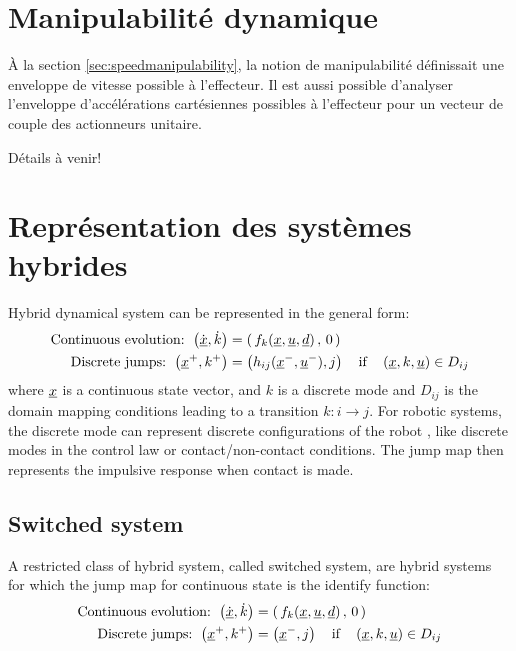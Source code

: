 \newpage
\section{Manipulabilité dynamique}
\label{sec:dynamicmanipulability}

À la section \ref{sec:speedmanipulability}, la notion de manipulabilité définissait une enveloppe de vitesse possible à l'effecteur. Il est aussi possible d'analyser l'enveloppe d'accélérations cartésiennes possibles à l'effecteur pour un vecteur de couple des actionneurs unitaire. 

Détails à venir!




\newpage
\section{Représentation des systèmes hybrides}


Hybrid dynamical system can be represented in the general form:
%
\begin{align}
\text{Continuous evolution: } \left(  \dot{\underline{x}} , \dot{k} \right) &=  \left( \, f_k( \underline{x} , \underline{u} , \underline{d} ) \, , \, 0 \, \right) \\
\text{Discrete jumps: } \left(  \underline{x}^+ , k^+ \right) &=  \left( h_{ij}( \underline{x}^- , \underline{u}^- ) , j \right) \quad\text{if}\quad \left(  \underline{x} , k , \underline{u} \right) \in D_{ij}  
\end{align}
%
where $\underline{x}$ is a continuous state vector, and $k$ is a discrete mode and $D_{ij}$ is the domain mapping conditions leading to a transition $k:i \rightarrow j$. For robotic systems, the discrete mode can represent discrete configurations of the robot , like discrete modes in the control law or contact/non-contact conditions. The jump map then represents the impulsive response when contact is made. 

\subsection{Switched system}

A restricted class of hybrid system, called switched system, are hybrid systems for which the jump map for continuous state is the identify function:
%
\begin{align}
\text{Continuous evolution: } \left(  \dot{\underline{x}} , \dot{k} \right) &=  \left( \, f_k( \underline{x} , \underline{u} , \underline{d} ) \, , \, 0 \, \right) \\
\text{Discrete jumps: } \left(  \underline{x}^+ , k^+ \right) &=  \left( \underline{x}^- , j \right) \quad\text{if}\quad \left(  \underline{x} , k , \underline{u} \right) \in D_{ij} 
\end{align}
%

